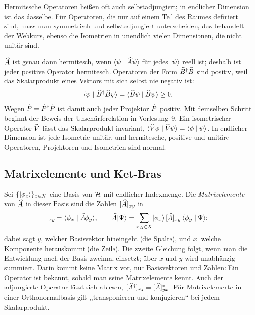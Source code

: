 Hermitesche Operatoren heißen oft auch selbstadjungiert; in endlicher Dimension ist das dasselbe. Für Operatoren, die nur auf einem Teil des Raumes definiert sind, muss man symmetrisch und selbstadjungiert unterscheiden; das behandelt der Webkurs, ebenso die Isometrien in unendlich vielen Dimensionen, die nicht unitär sind.

$\widehat{A}$ ist genau dann hermitesch, wenn $\langle \psi \mid \widehat{A}\psi \rangle$ für jedes $\lvert \psi \rangle$ reell ist; deshalb ist jeder positive Operator hermitesch. Operatoren der Form $\widehat{B}^{\dagger}\widehat{B}$ sind positiv, weil das Skalarprodukt eines Vektors mit sich selbst nie negativ ist:
\begin{equation}
	\langle \psi \mid \widehat{B}^{\dagger}\widehat{B}\psi \rangle = \langle \widehat{B}\psi \mid \widehat{B}\psi \rangle \geq 0.
\end{equation}
Wegen $\widehat{P} = \widehat{P}^{\dagger}\widehat{P}$ ist damit auch jeder Projektor $\widehat{P}$ positiv. Mit demselben Schritt beginnt der Beweis der Unschärferelation in Vorlesung~9. Ein isometrischer Operator $\widehat{V}$ lässt das Skalarprodukt invariant, $\langle \widehat{V}\phi \mid \widehat{V}\psi \rangle = \langle \phi \mid \psi \rangle$. In endlicher Dimension ist jede Isometrie unitär, und hermitesche, positive und unitäre Operatoren, Projektoren und Isometrien sind normal.

\subsection{Matrixelemente und Ket-Bras}
Sei $\{\lvert \phi_x \rangle\}_{x\in X}$ eine Basis von $\mathcal{H}$ mit endlicher Indexmenge. Die \emph{Matrixelemente} von $\widehat{A}$ in dieser Basis sind die Zahlen $[\widehat{A}]_{xy}$ in
\begin{equation}
	[\op{A}]_{xy} = \braket{\phi_x}{\op{A}\phi_y}, \qquad
	\op{A}\ket{\Psi} = \sum_{x,y\in X}\ket{\phi_x}\,[\op{A}]_{xy}\,\braket{\phi_y}{\Psi};
\end{equation}
dabei sagt $y$, welcher Basisvektor hineingeht (die Spalte), und $x$, welche Komponente herauskommt (die Zeile). Die zweite Gleichung folgt, wenn man die Entwicklung nach der Basis zweimal einsetzt; über $x$ und $y$ wird unabhängig summiert. Darin kommt keine Matrix vor, nur Basisvektoren und Zahlen: Ein Operator ist bekannt, sobald man seine Matrixelemente kennt. Auch der adjungierte Operator lässt sich ablesen, $[\widehat{A}^{\dagger}]_{xy} = [\widehat{A}]_{yx}^*$: Für Matrixelemente in einer Orthonormalbasis gilt ,,transponieren und konjugieren`` bei jedem Skalarprodukt.

